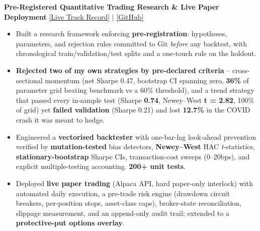 %
%

\noindent\textbf{Pre-Registered Quantitative Trading Research \& Live Paper Deployment} \hfill \href{https://harshitk2814.github.io/quantitative-trading-research/}{[Live Track Record]} $\mid$ \href{https://github.com/HarshitK2814/quantitative-trading-research}{[GitHub]}
\begin{itemize}
    \item Built a research framework enforcing \textbf{pre-registration}: hypotheses, parameters, and rejection rules committed to Git \textit{before} any backtest, with chronological train/validation/test splits and a one-touch rule on the holdout.
    \item \textbf{Rejected two of my own strategies by pre-declared criteria} -- cross-sectional momentum (net Sharpe 0.47, bootstrap CI spanning zero, \textbf{36\%} of parameter grid beating benchmark vs a 60\% threshold), and a trend strategy that passed every in-sample test (Sharpe \textbf{0.74}, Newey--West \textbf{t = 2.82}, 100\% of grid) yet \textbf{failed validation} (Sharpe 0.21) and lost \textbf{12.7\%} in the COVID crash it was meant to hedge.
    \item Engineered a \textbf{vectorised backtester} with one-bar-lag look-ahead prevention verified by \textbf{mutation-tested} bias detectors, \textbf{Newey--West} HAC \textit{t}-statistics, \textbf{stationary-bootstrap} Sharpe CIs, transaction-cost sweeps (0--20bps), and explicit multiple-testing accounting. \textbf{200+ unit tests}.
    \item Deployed \textbf{live paper trading} (Alpaca API, hard paper-only interlock) with automated daily execution, a pre-trade risk engine (drawdown circuit breakers, per-position stops, asset-class caps), broker-state reconciliation, slippage measurement, and an append-only audit trail; extended to a \textbf{protective-put options overlay}.
\end{itemize}
